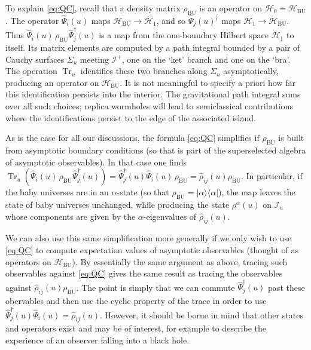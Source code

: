 \documentclass[letterpaper,12pt]{article}
\newcommand*{\hilb}{\mathcal{H}}	%
\newcommand*{\hbu}{\mathcal{H}_\text{BU}} %
\DeclareMathOperator{\Tr}{Tr}
\newcommand*{\scri}{\mathscr{I}} %
\begin{document}
To explain \eqref{eq:QC}, recall that a density matrix $\rho_\mathrm{BU}$ is an operator on $\hilb_0 = \hbu$. The operator $\hat{\Psi}_i(u)$ maps $\hbu \rightarrow \hilb_1$, and so
$\hat{\Psi}_j(u)^\dagger$ maps $\hilb_1 \rightarrow \hbu$.  Thus $\hat{\Psi}_i(u) \, \rho_\mathrm{BU} \hat{\Psi}_j^\dag(u)$ is a map from the one-boundary Hilbert space $\hilb_1$ to itself. Its matrix elements are computed by a path integral bounded by a pair of Cauchy surfaces $\Sigma_u$ meeting $\scri^+$, one on the `ket' branch and one on the `bra'.  The operation $\Tr_u$ identifies these two branches along $\Sigma_u$ asymptotically, producing an operator on $\hbu$. It is not meaningful to specify a priori how far this identification persists into the interior.  The gravitational path integral sums over all such choices; replica wormholes will lead to semiclassical contributions where the identifications persist to the edge of the associated island.

As is the case for all our discussions, the formula \eqref{eq:QC} simplifies if $\rho_\mathrm{BU}$ is built from asymptotic boundary conditions (so that is part of the superselected algebra of asymptotic observables). In that case one finds $\Tr_u(\hat{\Psi}_i(u) \, \rho_\mathrm{BU} \hat{\Psi}_j^\dag(u)) = \hat{\Psi}_j^\dag(u)\hat{\Psi}_i(u) \, \rho_\mathrm{BU} = \hat{\rho}_{ij}(u) \rho_\mathrm{BU}$. In particular, if the baby universes are in an $\alpha$-state (so that $\rho_\mathrm{BU} = |\alpha\rangle\langle\alpha|$), the map leaves the state of baby universes unchanged, while producing the state $\rho^\alpha(u)$ on $\scri_u$ whose components are given by the $\alpha$-eigenvalues of $\hat{\rho}_{ij}(u)$.

We can also use this same simplification more generally if
we only wish to use \eqref{eq:QC} to compute expectation values of asymptotic observables (thought of as operators on $\hbu$).
By essentially the same argument as above, tracing such observables against \eqref{eq:QC} gives the same result as tracing the observables against
$\hat{\rho}_{ij}(u) \rho_\mathrm{BU}$. The point is simply that we can commute $\hat{\Psi}_j^\dag(u)$ past these obervables and then use the cyclic property of the trace in order to use $\hat{\Psi}_j^\dag(u)\hat{\Psi}_i(u) = \hat{\rho}_{ij}(u)$. However, it should be borne in mind that other states and operators exist and may be of interest, for example to describe the experience of an observer falling into a black hole.



\end{document}
